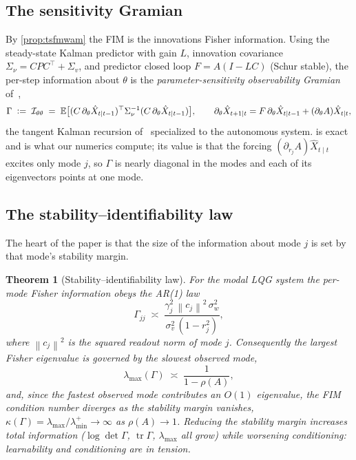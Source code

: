 \documentclass[10pt]{article}
\theoremstyle{plain}
\newtheorem{theorem}{Theorem}[section]
\theoremstyle{definition}
\theoremstyle{remark}
\newcommand{\E}{\mathbb{E}}
\DeclareMathOperator{\tr}{tr}
\newcommand{\Fisher}{\mathcal{I}}
\newcommand{\Ith}{\Fisher_{\theta\theta}}
\newcommand{\Gam}{\Gamma}
\newcommand{\defeq}{\vcentcolon=}
\newcommand{\norm}[1]{\left\lVert #1 \right\rVert}
\begin{document}
\subsection{The sensitivity Gramian}
By \cref{prop:tsfmwam} the FIM is the innovations Fisher information. Using the
steady-state Kalman predictor with gain $L$, innovation covariance
$\Sigma_\nu=CPC^\top+\Sigma_v$, and predictor closed loop $F=A(I-LC)$ (Schur
stable), the per-step information about $\theta$ is the
\emph{parameter-sensitivity observability Gramian} of~\cite[Cor.~9.5]{wamvla},
\begin{equation}
 \Gam \;\defeq\; \Ith \;=\;
 \E\big[(C\,\partial_\theta\hat X_{t\mid t-1})^\top\Sigma_\nu^{-1}
        (C\,\partial_\theta\hat X_{t\mid t-1})\big],\qquad
 \partial_\theta\hat X_{t+1\mid t}=F\,\partial_\theta\hat X_{t\mid t-1}
   +(\partial_\theta A)\hat X_{t\mid t},
 \label{eq:gramian}
\end{equation}
the tangent Kalman recursion of~\cite[App.~A]{wamvla} specialized to the
autonomous system.  is exact and is what our numerics compute;
its value is that the forcing $(\partial_{r_j}A)\hat X_{t\mid t}$ excites only
mode $j$, so $\Gam$ is nearly diagonal in the modes and each of its eigenvectors
points at one mode.

\subsection{The stability--identifiability law}
The heart of the paper is that the size of the information about mode $j$ is set
by that mode's stability margin.

\begin{theorem}[Stability--identifiability law]\label{thm:stability}
For the modal LQG system the per-mode Fisher information obeys the AR(1) law
\begin{equation}
 \Gam_{jj}\;\asymp\;\frac{\gamma_j^2\,\norm{c_j}^2\,\sigma_w^2}
                          {\sigma_v^2\,(1-r_j^2)},
 \label{eq:arlaw}
\end{equation}
where $\norm{c_j}^2$ is the squared readout norm of mode $j$. Consequently the
largest Fisher eigenvalue is governed by the slowest observed mode,
\begin{equation}
 \lambda_{\max}(\Gam)\;\asymp\;\frac{1}{1-\rho(A)},
 \label{eq:lammax}
\end{equation}
and, since the fastest observed mode contributes an $O(1)$ eigenvalue, the FIM
condition number diverges as the stability margin vanishes,
$\kappa(\Gam)=\lambda_{\max}/\lambda_{\min}^{+}\to\infty$ as $\rho(A)\to1$.
Reducing the stability margin \emph{increases} total information
($\log\det\Gam$, $\tr\Gam$, $\lambda_{\max}$ all grow) while \emph{worsening}
conditioning: learnability and conditioning are in tension.
\end{theorem}
\end{document}
